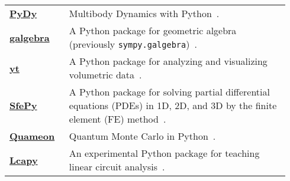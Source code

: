 \begin{longtable}[htbc]{>{\raggedright}p{0.2\linewidth}p{0.74\linewidth}}
\href{http://www.pydy.org/}{\textbf{PyDy}} & Multibody Dynamics with
  Python~\cite{gede2013constrained}. \\

\href{https://github.com/brombo/galgebra}{\textbf{galgebra}} &
  A Python package for geometric algebra (previously \texttt{sympy.galgebra})~\cite{galgebra}. \\

\href{http://yt-project.org/}{\textbf{yt}} & A Python package for
  analyzing and visualizing volumetric data~\cite{2011ApJS..192....9T}. \\

\href{http://sfepy.org/}{\textbf{SfePy}} &
  A Python package for solving partial
  differential equations (PDEs) in 1D, 2D, and 3D by the finite element (FE)
  method~\cite{Zienkiewicz2013FEM,cimrman2014sfepy}. \\

\href{http://quameon.sourceforge.net/}{\textbf{Quameon}} & Quantum
  Monte Carlo in Python~\cite{quameon}. \\

\href{http://lcapy.elec.canterbury.ac.nz/}{\textbf{Lcapy}} &
  An experimental Python package for teaching linear circuit analysis~\cite{lcapy}. \\
\bottomrule
\end{longtable}
